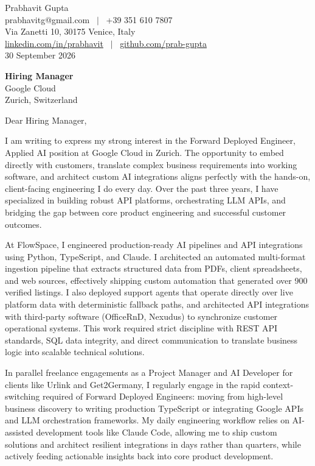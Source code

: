 \documentclass[10.5pt,a4paper]{article}
\begin{document}
Prabhavit Gupta\\
prabhavitg@gmail.com ~$\vert$~ +39 351 610 7807\\
Via Zanetti 10, 30175 Venice, Italy\\
\href{https://www.linkedin.com/in/prabhavit/}{linkedin.com/in/prabhavit} ~$\vert$~ \href{https://github.com/prab-gupta}{github.com/prab-gupta}\\
30 September 2026

\textbf{Hiring Manager}\\
Google Cloud\\
Zurich, Switzerland

Dear Hiring Manager,

I am writing to express my strong interest in the Forward Deployed Engineer, Applied AI position at Google Cloud in Zurich. The opportunity to embed directly with customers, translate complex business requirements into working software, and architect custom AI integrations aligns perfectly with the hands-on, client-facing engineering I do every day. Over the past three years, I have specialized in building robust API platforms, orchestrating LLM APIs, and bridging the gap between core product engineering and successful customer outcomes.

At FlowSpace, I engineered production-ready AI pipelines and API integrations using Python, TypeScript, and Claude. I architected an automated multi-format ingestion pipeline that extracts structured data from PDFs, client spreadsheets, and web sources, effectively shipping custom automation that generated over 900 verified listings. I also deployed support agents that operate directly over live platform data with deterministic fallback paths, and architected API integrations with third-party software (OfficeRnD, Nexudus) to synchronize customer operational systems. This work required strict discipline with REST API standards, SQL data integrity, and direct communication to translate business logic into scalable technical solutions.

In parallel freelance engagements as a Project Manager and AI Developer for clients like Urlink and Get2Germany, I regularly engage in the rapid context-switching required of Forward Deployed Engineers: moving from high-level business discovery to writing production TypeScript or integrating Google APIs and LLM orchestration frameworks. My daily engineering workflow relies on AI-assisted development tools like Claude Code, allowing me to ship custom solutions and architect resilient integrations in days rather than quarters, while actively feeding actionable insights back into core product development.
\end{document}
